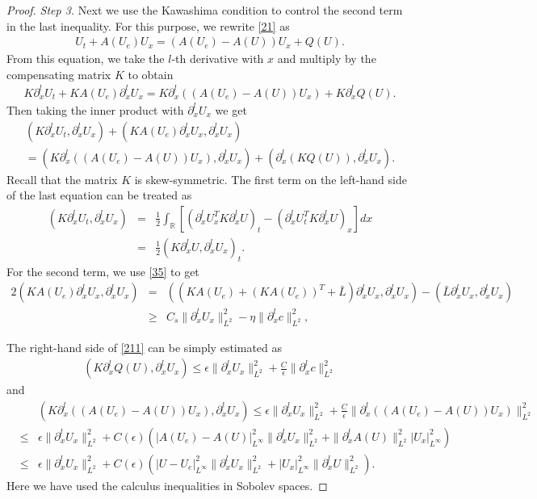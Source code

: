 \documentclass{article}
\theoremstyle{plain}
\begin{document}
\begin{proof}
\emph{Step 3.} Next we use the Kawashima condition to control the second term in the last inequality. For this purpose,  we rewrite \eqref{21} as
\begin{eqnarray*}
  U_t + A(U_e) U_x  = (A(U_e) -A(U))U_x + Q(U).
\end{eqnarray*}
From this equation, we take the $l$-th derivative with $x$ and multiply by the compensating matrix $K$ to obtain
\begin{eqnarray*}
  K \partial^l_x U_t + K A(U_e) \partial^l_x U_x  = K \partial^l_x ((A(U_e)-A(U))U_x) + K\partial^l_x Q(U).
\end{eqnarray*}
Then taking the inner product with $\partial^l_x U_x$ we get
\begin{eqnarray}\label{211}
  (K \partial^l_x U_t, \partial^l_x U_x) + (KA(U_e) \partial^l_x U_x, \partial^l_x U_x) \nonumber \\ = (K \partial^l_x((A(U_e)-A(U))U_x),\partial^l_x U_x) + (\partial^l_x( K Q(U) ),\partial^l_x U_x).
\end{eqnarray}
Recall that the matrix $K$ is skew-symmetric. The first term on the left-hand side of the last equation can be treated as
\begin{eqnarray}\label{212}
  (K\partial^l_x U_t, \partial^l_x U_x) &=& \frac{1}{2} \int_\mathbb{R} \left[(\partial^l_x U^T_x K \partial^l_x U )_t -  (\partial^l_x U_t^T K\partial^l_x U  )_x \right]dx  \nonumber \\
  &=& \frac{1}{2}(K \partial^l_x U,\partial^l_x U_x)_t .
\end{eqnarray}
For the second term, we use \eqref{35} to get
\begin{eqnarray}\label{213}
  2(KA(U_e) \partial^l_x U_x,\partial^l_x U_x) &=& ( (KA(U_e)+ (K A(U_e))^T +\bar{L}) \partial^l_x U_x, \partial^l_x U_x) - (\bar{L}\partial^l_x U_x, \partial^l_x U_x) \nonumber\\
  &\ge& C_s \|\partial^l_x U_x \|^2_{L^2} -\eta \|\partial^l_x c\|^2_{L^2},
\end{eqnarray}

The right-hand side of \eqref{211} can be simply estimated as
\begin{eqnarray}\label{214}
  (K \partial^l_x Q(U),\partial^l_x U_x) \le \epsilon \|\partial^l_x U_x\|_{L^2}^2 + \frac{C}{\epsilon} \|\partial^l_x c\|_{L^2}^2
\end{eqnarray}
and
\begin{eqnarray}\label{215}
  && (K\partial^l_x ((A(U_e)-A(U))U_x),\partial^l_x U_x) \le \epsilon\|\partial^l_x U_x\|_{L^2}^2 + \frac{C}{\epsilon} \|\partial^l_x( (A(U_e)-A(U))U_x)\|_{L^2}^2 \nonumber \\
  &\le& \epsilon \|\partial^l_x U_x \|_{L^2}^2 + C(\epsilon)( |A(U_e)-A(U )|_{L^\infty}^2 \|\partial^l_x U_x\|^2_{L^2}+\|\partial^l_x A(U)\|_{L^2}^2|U_x|_{L^\infty}^2) \nonumber \\
  &\le& \epsilon \|\partial^l_x U_x\|_{L^2}^2 + C(\epsilon) (|U-U_e|_{L^\infty}^2 \|\partial^l_x U_x\|_{L^2}^2 + |U_x|_{L^\infty}^2 \|\partial^l_x U\|_{L^2}^2).
\end{eqnarray}
Here we have used the calculus inequalities in Sobolev spaces.


\end{proof}
\end{document}
